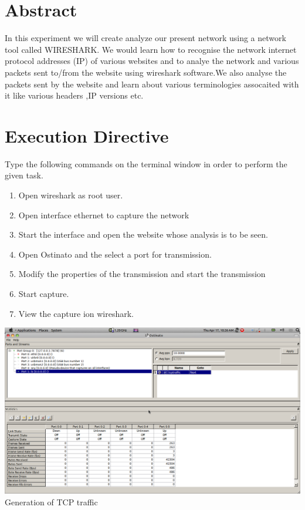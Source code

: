 \documentclass[a4paper,12pt,oneside]{article}
\begin{document}
\newpage

\section {Abstract}

In this experiment we will create analyze our present network using a network tool called WIRESHARK.
We would learn how to recognise the network internet protocol addresses (IP) of various websites and to analye the network and various packets sent to/from the website using 
wireshark software.We also analyse the packets sent by the website and learn about various terminologies assocaited with it like various headers
,IP versions etc.

\newpage


\section{Execution Directive}  
Type the following commands on the terminal window in order to perform the given task.
\begin{enumerate}
 \item Open wireshark as root user.
 \item Open interface ethernet to capture the network  
 \item Start the interface and open the website whose analysis is to be seen.
 \item Open Ostinato and the select a port for transmission.
 \item Modify the properties of the transmission and start the transmission
 \item Start capture.
 \item View the capture ion wireshark.
 \end{enumerate}
\begin{center}
 \includegraphics[width=13 cm,height=12 cm]{./tcptraffic.png}
Generation of TCP traffic
\end{center}
\end{document}
